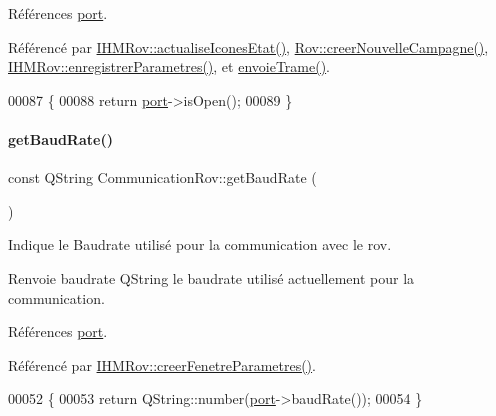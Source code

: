 Références \hyperlink{class_communication_rov_a21b62067ef0b2a6aec339df60b4abd72}{port}.



Référencé par \hyperlink{class_i_h_m_rov_abbfcdc154a6ae7f941d186f6c90a5a2b}{I\+H\+M\+Rov\+::actualise\+Icones\+Etat()}, \hyperlink{class_rov_ae1306036b067e9ad50a09f9dd607a092}{Rov\+::creer\+Nouvelle\+Campagne()}, \hyperlink{class_i_h_m_rov_a94d31f4e748f3e4549eab42c8bc7e367}{I\+H\+M\+Rov\+::enregistrer\+Parametres()}, et \hyperlink{class_communication_rov_ac243fcfb073f4ceaf58fab1d41207801}{envoie\+Trame()}.


\begin{DoxyCode}
00087 \{
00088     \textcolor{keywordflow}{return} \hyperlink{class_communication_rov_a21b62067ef0b2a6aec339df60b4abd72}{port}->isOpen();
00089 \}
\end{DoxyCode}
\mbox{\label{class_communication_rov_a810de691dfc6d305f77c92ccd90bb6db}} 
\paragraph{\texorpdfstring{get\+Baud\+Rate()}{getBaudRate()}}
{\footnotesize\ttfamily const Q\+String Communication\+Rov\+::get\+Baud\+Rate (\begin{DoxyParamCaption}{ }\end{DoxyParamCaption})}

Indique le Baudrate utilisé pour la communication avec le rov.

\begin{DoxyReturn}{Renvoie}
baudrate Q\+String le baudrate utilisé actuellement pour la communication. 
\end{DoxyReturn}


Références \hyperlink{class_communication_rov_a21b62067ef0b2a6aec339df60b4abd72}{port}.



Référencé par \hyperlink{class_i_h_m_rov_aed451139ac09ef18b7c92637761d80ce}{I\+H\+M\+Rov\+::creer\+Fenetre\+Parametres()}.


\begin{DoxyCode}
00052 \{
00053     \textcolor{keywordflow}{return} QString::number(\hyperlink{class_communication_rov_a21b62067ef0b2a6aec339df60b4abd72}{port}->baudRate());
00054 \}
\end{DoxyCode}
\mbox{\label{class_communication_rov_a6226f9338fffc648cfca91c8e585a26b}} 
